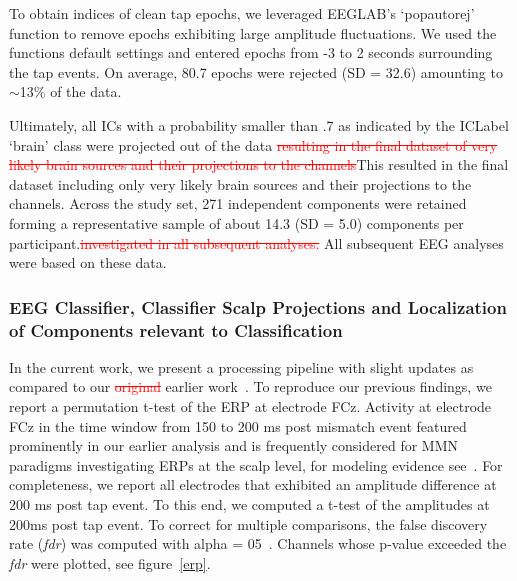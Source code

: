 \textcolor{n}{To obtain indices of clean tap epochs, we leveraged EEGLAB's `pop\textunderscore autorej' function to remove epochs exhibiting large amplitude fluctuations. We used the functions default settings and entered epochs from -3 to 2 seconds surrounding the tap events. On average, 80.7 epochs were rejected (SD = 32.6) amounting to $\sim$13\% of the data.}

Ultimately, all ICs with a probability smaller than .7 as indicated by the ICLabel `brain' class were projected out of the data \textcolor{red}{\st{resulting in the final dataset of very likely brain sources and their projections to the channels}}\textcolor{n}{This resulted in the final dataset including only very likely brain sources and their projections to the channels}. Across the study set, 271 independent components were retained forming a representative sample of about 14.3 (SD = 5.0) components per participant.\textcolor{red}{\st{investigated in all subsequent analyses.}} \textcolor{n}{All subsequent EEG analyses were based on these data.} 

\subsubsection{EEG Classifier, Classifier Scalp Projections and Localization of Components relevant to Classification}

In the current work, we present a processing pipeline with slight updates as compared to our \textcolor{red}{\st{original}} \textcolor{n}{earlier} work~\cite{Gehrke2019-og}. To reproduce our previous findings, we report a permutation t-test of the ERP at electrode FCz. Activity at electrode FCz in the time window from 150 to 200 ms post mismatch event featured prominently in our earlier analysis and is frequently considered for MMN paradigms investigating ERPs at the scalp level, for modeling evidence see~\cite{Lieder2013-dl, Lieder2013-os}. \textcolor{n}{For completeness, we report all electrodes that exhibited an amplitude difference at 200 ms post tap event. To this end, we computed a t-test of the amplitudes at 200ms post tap event. To correct for multiple comparisons, the false discovery rate (\textit{fdr}) was computed with alpha = 05~\cite{Benjamini1995-cw}. Channels whose p-value exceeded the \textit{fdr} were plotted, see figure~\ref{erp}.}


